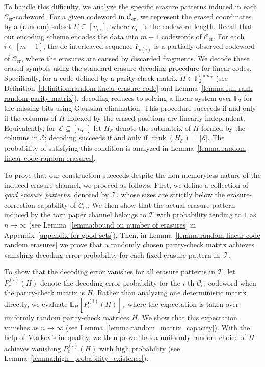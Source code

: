 \documentclass[journal,letterpaper,onecolumn,11pt]{IEEEtran}
\newcommand{\cC}{\mathcal{C}}
\newcommand{\cE}{\mathcal{E}}
\newcommand{\cT}{\mathcal{T}}
\begin{document}
To handle this difficulty, we analyze the specific erasure patterns induced in each $\cC_{\mathrm{er}}$-codeword.
For a given codeword in $\cC_{\mathrm{er}}$, we represent the erased coordinates by a (random) subset $E \subseteq [n_{\mathrm{er}}]$, where $n_{\mathrm{er}}$ is the codeword length. 
Recall that our encoding scheme encodes the data into $m-1$ codewords of $\cC_{\mathrm{er}}$. 
For each $i \in [m-1]$, the de-interleaved sequence $\hat{\mathbf{r}}_{v(i)}$ is a partially observed codeword of $\cC_{\mathrm{er}}$, where the erasures are caused by discarded fragments.
We decode these erased symbols using the standard erasure-decoding procedure for linear codes. Specifically,
for a code defined by a parity-check matrix
$H \in \mathbb{F}_2^{r \times n_{\mathrm{er}}}$
(see Definition~\ref{definition:random linear erasure code} and
Lemma~\ref{lemma:full rank random parity matrix}), decoding reduces to solving a linear system over
$\mathbb{F}_2$ for the missing bits using Gaussian elimination. 
This procedure succeeds if and
only if the columns of $H$ indexed by the erased positions are linearly independent. 
Equivalently, for~$\cE\subseteq[n_\text{er}]$ let $H_{\mathcal{E}}$ denote the submatrix of $H$ formed by the columns in $\mathcal{E}$; decoding succeeds if and only if $\operatorname{rank}(H_{\mathcal{E}})=|\mathcal{E}|$.
The probability of satisfying this condition is analyzed in Lemma~\ref{lemma:random linear code random erasures}.

To prove that our construction succeeds despite the non-memoryless nature of the induced erasure channel, we proceed as follows.
First, we define a collection of \emph{good erasure patterns}, denoted by $\mathcal{T}$, whose sizes are strictly
below the erasure-correction capability of $\cC_{\mathrm{er}}$. We then show that the actual erasure pattern induced
by the torn paper channel belongs to $\mathcal{T}$ with probability tending to $1$ as $n \to \infty$ (see Lemma~\ref{lemma:bound on number of erasures} in Appendix~\ref{appendix for good sets}).
Then, in Lemma~\ref{lemma:random linear code random erasures} we prove that a randomly chosen parity-check matrix achieves vanishing decoding error probability for each fixed erasure pattern in~$\cT$. 

To show that the decoding error vanishes for all erasure patterns in $\cT$, let $P_e^{(i)}(H)$ denote the decoding error probability for the $i$-th $\cC_{\mathrm{er}}$-codeword when the parity-check matrix is $H$. 
Rather than analyzing one deterministic matrix directly, we evaluate 
$\mathbb{E}_H\!\left[P_e^{(i)}(H)\right],$
where the expectation is taken over uniformly random parity-check matrices $H$.
We show that this expectation
vanishes as $n \to \infty$ (see Lemma~\ref{lemma:random_matrix_capacity}). 
With the help of Markov's inequality, we then prove  that a uniformly random choice of $H$ achieves vanishing $P_e^{(i)}(H)$ with high probability (see Lemma~\ref{lemma:high_probability_existence}).
\end{document}
